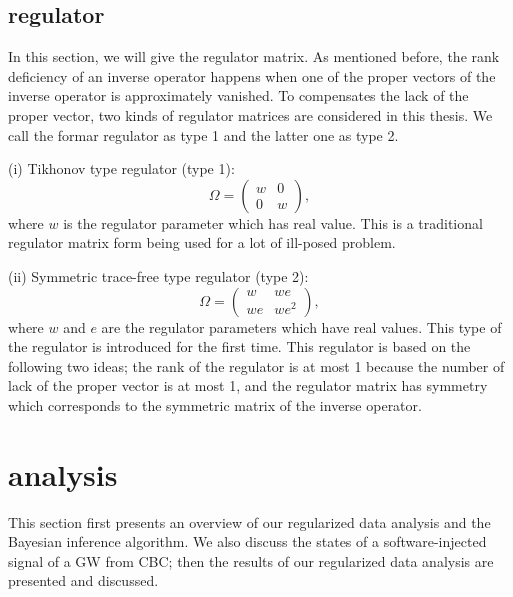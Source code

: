 \documentclass[%
 aps,
 prd,
 amsmath,amssymb,
 reprint,%
superscriptaddress
]{revtex4-1}
\begin{document}
\subsection{regulator}\label{ken-thesis-sec:formalism-regulator}
In this section, we will give the regulator matrix. As mentioned before, the rank deficiency of an inverse operator happens when one of the proper vectors of the inverse operator is approximately vanished. To compensates the lack of the proper vector, two kinds of regulator matrices are considered in this thesis. We call the formar regulator as type 1 and the latter one as type 2.

(i) Tikhonov type regulator (type 1):
\begin{equation}\label{ken-short_thesis-eq:1}
 \Omega = \begin{pmatrix}
           w & 0 \\
           0 & w 
          \end{pmatrix},
\end{equation}
where
$w$ is the regulator parameter which has real value. This is a traditional regulator matrix form being used for a lot of ill-posed problem.

(ii) Symmetric trace-free type regulator (type 2):
\begin{equation}\label{ken-short_thesis-eq:2}
 \Omega = \begin{pmatrix}
           w & we \\
           we & we^{2} 
          \end{pmatrix},
\end{equation}
where
$w$
and
$e$ are the regulator parameters which have real values. This type of the regulator is introduced for the first time. This regulator is based on the following two ideas; the rank of the regulator is at most 1 because the number of lack of the proper vector is at most 1, and the regulator matrix has symmetry which corresponds to the symmetric matrix of the inverse operator.

\section{analysis}\label{ken-short_thesis-sec:analysis}
This section first presents an overview of our regularized data analysis and the Bayesian inference algorithm. We also discuss the states of a software-injected signal of a GW from CBC; then the results of our regularized data analysis are presented and discussed.
\end{document}
